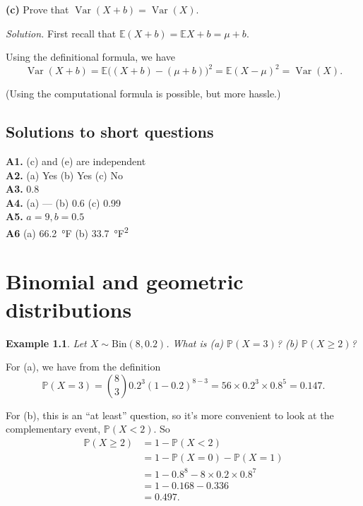 \documentclass[
  a4paper,
]{book}
\theoremstyle{definition}
\theoremstyle{definition}
\newtheorem{example}{Example}[chapter]
\theoremstyle{definition}
\theoremstyle{definition}
\theoremstyle{remark}
\begin{document}
\textbf{(c)} Prove that \(\operatorname{Var}(X+b) = \operatorname{Var}(X)\).

\begin{myanswers}
\emph{Solution.}
First recall that \(\mathbb E(X + b) = \mathbb EX + b = \mu + b\).

Using the definitional formula, we have
\[ \operatorname{Var}(X + b) = \mathbb E\big((X + b) - (\mu + b)\big)^2 = \mathbb E(X - \mu)^2 = \operatorname{Var}(X) . \]

(Using the computational formula is possible, but more hassle.)

\end{myanswers}

\hypertarget{P3-short-sols}{%
\section*{Solutions to short questions}\label{P3-short-sols}}

\textbf{A1.} (c) and (e) are independent\\
\textbf{A2.} (a) Yes (b) Yes (c) No\\
\textbf{A3.} 0.8\\
\textbf{A4.} (a) --- (b) 0.6 (c) 0.99\\
\textbf{A5.} \(a = 9, b = 0.5\)\\
\textbf{A6} (a) 66.2~°F (b) 33.7~°F\textsuperscript{2}

\hypertarget{L11-binomial-poisson}{%
\chapter{Binomial and geometric distributions}\label{L11-binomial-poisson}}

\begin{example}
\emph{Let \(X \sim \mathrm{Bin}(8, 0.2)\). What is (a) \(\mathbb P(X = 3)\)? (b) \(\mathbb P(X \geq 2)\)?}

For (a), we have from the definition
\[ \mathbb P(X = 3) = \binom83 0.2^3 (1 - 0.2)^{8-3} = 56\times 0.2^3\times0.8^5 = 0.147 .\]

For (b), this is an ``at least'' question, so it's more convenient to look at the complementary event, \(\mathbb P(X < 2)\). So
\begin{align*}
\mathbb P(X \geq 2) &= 1 - \mathbb P(X < 2) \\
  &= 1 - \mathbb P(X = 0) - \mathbb P(X = 1) \\
  &= 1 - 0.8^8 - 8\times 0.2 \times 0.8^7 \\
  &= 1 - 0.168 - 0.336 \\
  & = 0.497 .
\end{align*}
\end{example}
\end{document}
